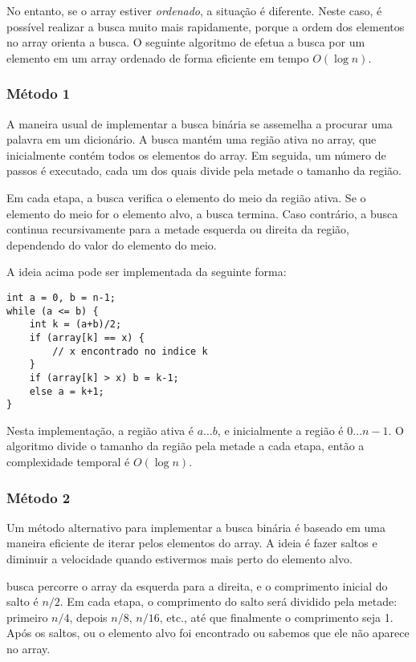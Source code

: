No entanto, se o array estiver \emph{ordenado},
a situação é diferente.
Neste caso, é possível realizar a busca muito mais rapidamente, porque a ordem dos elementos no array orienta a busca.
O seguinte algoritmo de 
efetua a busca por um elemento em um array ordenado de forma eficiente em
tempo $O(\log n)$.

\subsubsection{Método 1}

A maneira usual de implementar a busca binária se assemelha a procurar uma palavra em um dicionário. A busca mantém uma região ativa no array, que inicialmente contém todos os elementos do array. Em seguida, um número de passos é executado, cada um dos quais divide pela metade o tamanho da região.

Em cada etapa, a busca verifica o elemento do meio da região ativa. Se o elemento do meio for o elemento alvo, a busca termina. Caso contrário, a busca continua recursivamente para a metade esquerda ou direita da região, dependendo do valor do elemento do meio.

A ideia acima pode ser implementada da seguinte forma:
\begin{lstlisting}
int a = 0, b = n-1;
while (a <= b) {
    int k = (a+b)/2;
    if (array[k] == x) {
        // x encontrado no indice k
    }
    if (array[k] > x) b = k-1;
    else a = k+1;
}
\end{lstlisting}

Nesta implementação, a região ativa é $a \ldots b$,
e inicialmente a região é $0 \ldots n-1$.
O algoritmo divide o tamanho da região pela metade a cada etapa,
então a complexidade temporal é $O(\log n)$.

\subsubsection{Método 2}

Um método alternativo para implementar a busca binária é baseado em uma maneira eficiente de iterar pelos elementos do array.
A ideia é fazer saltos e diminuir a velocidade quando estivermos mais perto do elemento alvo.

 busca percorre o array da esquerda para a direita, e o comprimento inicial do salto é $n/2$.
Em cada etapa, o comprimento do salto será dividido pela metade:
primeiro $n/4$, depois $n/8$, $n/16$, etc., até que finalmente o comprimento seja 1.
Após os saltos, ou o elemento alvo foi encontrado ou sabemos que ele não aparece no array.

